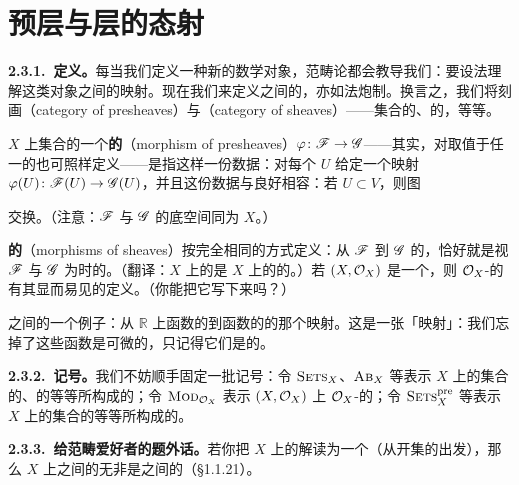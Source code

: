 
\section{预层与层的态射}

\textbf{2.3.1.\ 定义。}\quad 每当我们定义一种新的数学对象，范畴论都会教导我们：要设法理解这类对象之间的映射。现在我们来定义\trPresheaf{}之间的\trMorphism，\trSheaf{}亦如法炮制。换言之，我们将刻画\textbf{\trPresheaf\trCategory}（category of presheaves）与\textbf{\trSheaf\trCategory}（category of sheaves）——集合的、\trAbelianGroups{}的，等等。

$X$ 上集合的一个\textbf{\trPresheaf{}的\trMorphism}（morphism of presheaves）$\varphi\colon\mathscr{F}\to\mathscr{G}$——其实，对取值于任一\trCategory{}的\trPresheaf{}也可照样定义——是指这样一份数据：对每个 $U$ 给定一个映射 $\varphi(U)\colon\mathscr{F}(U)\to\mathscr{G}(U)$，并且这份数据与\trRestrictionMap{}良好相容：若 $U\subset V$，则图
交换。（注意：$\mathscr{F}$ 与 $\mathscr{G}$ 的底空间同为 $X$。）

\textbf{\trSheaf{}的\trMorphism}（morphisms of sheaves）按完全相同的方式定义：从\trSheaf{} $\mathscr{F}$ 到\trSheaf{} $\mathscr{G}$ 的\trMorphism，恰好就是视 $\mathscr{F}$ 与 $\mathscr{G}$ 为\trPresheaf{}时的\trMorphism{}。（翻译：$X$ 上的\trSheaf\trCategory{}是 $X$ 上的\trPresheaf\trCategory{}的\trFullSubcategory{}。）若 $(X,\mathcal{O}_X)$ 是一个\trRingedSpace，则 $\mathcal{O}_X$-\trModule{}的\trMorphism{}有其显而易见的定义。（你能把它写下来吗？）

\trSheaf{}之间\trMorphism{}的一个例子：从 $\mathbb{R}$ 上\trSmooth{}函数的\trSheaf{}到\trContinuous{}函数的\trSheaf{}的那个映射。这是一张「\trForgetful{}映射」：我们忘掉了这些函数是可微的，只记得它们是\trContinuous{}的。

\textbf{2.3.2.\ 记号。}\quad 我们不妨顺手固定一批记号：令 $\textsc{Sets}_{X}$、$\textsc{Ab}_{X}$ 等表示\trTopologicalSpace{} $X$ 上的集合的\trSheaf、\trAbelianGroups{}的\trSheaf{}等等所构成的\trCategory；令 $\textsc{Mod}_{\mathcal{O}_X}$ 表示\trRingedSpace{} $(X,\mathcal{O}_X)$ 上 $\mathcal{O}_X$-\trModule{}的\trCategory；令 $\textsc{Sets}^{\mathrm{pre}}_{X}$ 等表示 $X$ 上的集合的\trPresheaf{}等等所构成的\trCategory。

\textbf{2.3.3.\ 给范畴爱好者的题外话。}\quad 若你把 $X$ 上的\trPresheaf{}解读为一个\trContravariantFunctor{}（从开集的\trCategory{}出发），那么 $X$ 上\trPresheaf{}之间的\trMorphism{}无非是\trFunctor{}之间的\trNaturalTransformation{}（\S1.1.21）。

